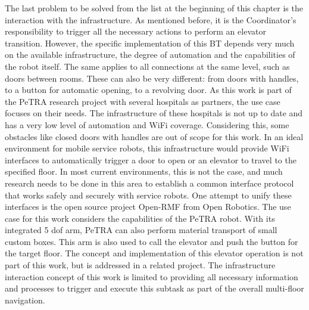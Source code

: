The last problem to be solved from the list at the beginning of this chapter is the interaction with the infrastructure. As mentioned before, it is the Coordinator's responsibility to trigger all the necessary actions to perform an elevator transition. However, the specific implementation of this BT depends very much on the available infrastructure, the degree of automation and the capabilities of the robot itself. The same applies to all connections at the same level, such as doors between rooms. These can also be very different: from doors with handles, to a button for automatic opening, to a revolving door. As this work is part of the PeTRA research project with several hospitals as partners, the use case focuses on their needs. The infrastructure of these hospitals is not up to date and has a very low level of automation and WiFi coverage. Considering this, some obstacles like closed doors with handles are out of scope for this work. In an ideal environment for mobile service robots, this infrastructure would provide WiFi interfaces to automatically trigger a door to open or an elevator to travel to the specified floor. In most current environments, this is not the case, and much research needs to be done in this area to establish a common interface protocol that works safely and securely with service robots. One attempt to unify these interfaces is the open source project Open-RMF \cite{openrobotics_open-rmf_2023} from Open Robotics. The use case for this work considers the capabilities of the PeTRA robot. With its integrated 5 \gls{dof} arm, PeTRA can also perform material transport of small custom boxes. This arm is also used to call the elevator and push the button for the target floor. The concept and implementation of this elevator operation is not part of this work, but is addressed in a related project. The infrastructure interaction concept of this work is limited to providing all necessary information and processes to trigger and execute this subtask as part of the overall multi-floor navigation.